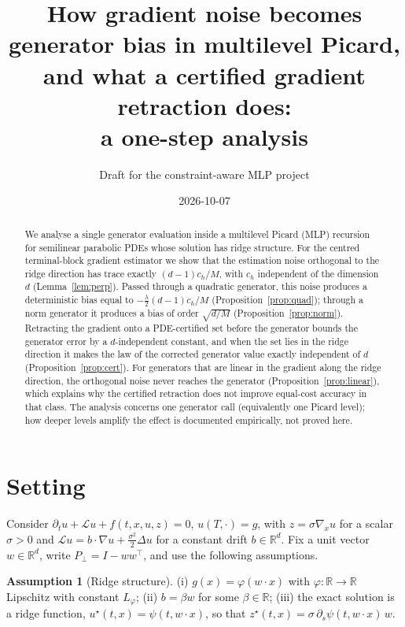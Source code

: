 \documentclass[11pt]{article}
\title{How gradient noise becomes generator bias in multilevel Picard,\\
and what a certified gradient retraction does:\\ a one-step analysis}
\author{Draft for the constraint-aware MLP project}
\date{2026-10-07}
\theoremstyle{remark}
\theoremstyle{definition}
\newtheorem{assumption}{Assumption}
\newcommand{\R}{\mathbb R}
\newcommand{\Pperp}{P_{\perp}}
\begin{document}
\maketitle

\begin{abstract}
We analyse a single generator evaluation inside a multilevel Picard (MLP) recursion for
semilinear parabolic PDEs whose solution has ridge structure.
For the centred terminal-block gradient estimator we show that the estimation noise
orthogonal to the ridge direction has trace exactly $(d-1)c_h/M$, with $c_h$
independent of the dimension $d$ (Lemma~\ref{lem:perp}).
Passed through a quadratic generator, this noise produces a deterministic bias equal to
$-\tfrac{\lambda}{2}(d-1)c_h/M$ (Proposition~\ref{prop:quad}); through a norm
generator it produces a bias of order $\sqrt{d/M}$ (Proposition~\ref{prop:norm}).
Retracting the gradient onto a PDE-certified set before the generator bounds the
generator error by a $d$-independent constant, and when the set lies in the ridge
direction it makes the law of the corrected generator value exactly independent of $d$
(Proposition~\ref{prop:cert}).
For generators that are linear in the gradient along the ridge direction, the orthogonal
noise never reaches the generator (Proposition~\ref{prop:linear}), which explains why
the certified retraction does not improve equal-cost accuracy in that class.
The analysis concerns one generator call (equivalently one Picard level); how deeper
levels amplify the effect is documented empirically, not proved here.
\end{abstract}

\section{Setting}

Consider $\partial_t u+\mathcal L u+f(t,x,u,z)=0$, $u(T,\cdot)=g$, with
$z=\sigma\nabla_x u$ for a scalar $\sigma>0$ and
$\mathcal L u=b\cdot\nabla u+\tfrac{\sigma^2}{2}\Delta u$ for a constant drift
$b\in\R^d$. Fix a unit vector $w\in\R^d$, write $\Pperp=I-ww^\top$, and use the following
assumptions.

\begin{assumption}[Ridge structure]\label{ass:ridge}
(i) $g(x)=\varphi(w\cdot x)$ with $\varphi:\R\to\R$ Lipschitz with constant $L_\varphi$;
(ii) $b=\beta w$ for some $\beta\in\R$;
(iii) the exact solution is a ridge function, $u^\star(t,x)=\psi(t,w\cdot x)$, so that
$z^\star(t,x)=\sigma\,\partial_s\psi(t,w\cdot x)\,w$.
\end{assumption}
\end{document}
